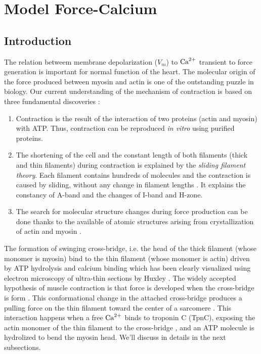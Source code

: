 \chapter{Model Force-Calcium}
\label{chap:force_calcium}
 
\section{Introduction}

The relation betweem membrane depolarization ($V_m$) to ${\text{Ca}^{2+}}$ transient to force
generation is important for normal function of the heart. The molecular origin
of the force produced between myosin and actin is one of the outstanding puzzle
in biology. Our current understanding of the mechanism of contraction is based
on three fundamental discoveries \citep{szent-gyorgyi2004}:
\begin{enumerate}
  \item Contraction is the result of the interaction of two proteins (actin and
  myosin) with ATP. Thus, contraction can be reproduced {\it in vitro} using
  purified proteins.

  \item The shortening of the cell and the constant length of both
  filaments (thick and thin filaments) during contraction is explained by the
  {\it sliding filament theory}. Each filament contains hundreds of
  molecules and the contraction is caused by sliding, without any change in
  filament lengths \citep{cooke2004}. It explains the constancy of A-band and
  the changes of I-band and H-zone.

  \item The search for molecular structure changes during force production can
  be done thanks to the available of atomic structures arising from
  crystallization of actin and myosin \citep{rayment1993}.
\end{enumerate}

The formation of swinging cross-bridge, i.e. the head of the thick filament
(whose monomer is myosin) bind to the thin filament (whose monomer is actin)
driven by ATP hydrolysis and calcium binding which has been clearly visualized
using electron microscopy of ultra-thin sections by Huxley
\citep{huxley1957,huxley1974}.
The widely accepted hypothesis of muscle contraction is that force is developed
when the cross-bridge is form \citep{huxley1954}. This conformational change in
the attached cross-bridge produces a pulling force on the thin filament toward
the center of a sarcomere \citep{geeves2005}. This interaction happens when a
free ${\text{Ca}^{2+}}$ binds to troponin C (TpnC), exposing the actin monomer of the thin
filament to the cross-bridge \citep{ford1991}, and an ATP molecule is hydrolized
to bend the myosin head. We'll discuss in details in the next subsections.

